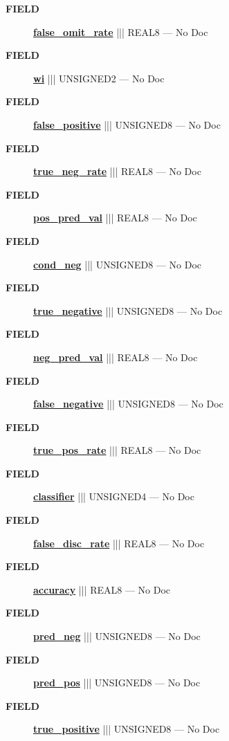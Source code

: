 \par
\begin{description}
\item [\colorbox{tagtype}{\color{white} \textbf{\textsf{FIELD}}}] \textbf{\underline{false\_omit\_rate}} ||| REAL8 --- No Doc
\item [\colorbox{tagtype}{\color{white} \textbf{\textsf{FIELD}}}] \textbf{\underline{wi}} ||| UNSIGNED2 --- No Doc
\item [\colorbox{tagtype}{\color{white} \textbf{\textsf{FIELD}}}] \textbf{\underline{false\_positive}} ||| UNSIGNED8 --- No Doc
\item [\colorbox{tagtype}{\color{white} \textbf{\textsf{FIELD}}}] \textbf{\underline{true\_neg\_rate}} ||| REAL8 --- No Doc
\item [\colorbox{tagtype}{\color{white} \textbf{\textsf{FIELD}}}] \textbf{\underline{pos\_pred\_val}} ||| REAL8 --- No Doc
\item [\colorbox{tagtype}{\color{white} \textbf{\textsf{FIELD}}}] \textbf{\underline{cond\_neg}} ||| UNSIGNED8 --- No Doc
\item [\colorbox{tagtype}{\color{white} \textbf{\textsf{FIELD}}}] \textbf{\underline{true\_negative}} ||| UNSIGNED8 --- No Doc
\item [\colorbox{tagtype}{\color{white} \textbf{\textsf{FIELD}}}] \textbf{\underline{neg\_pred\_val}} ||| REAL8 --- No Doc
\item [\colorbox{tagtype}{\color{white} \textbf{\textsf{FIELD}}}] \textbf{\underline{false\_negative}} ||| UNSIGNED8 --- No Doc
\item [\colorbox{tagtype}{\color{white} \textbf{\textsf{FIELD}}}] \textbf{\underline{true\_pos\_rate}} ||| REAL8 --- No Doc
\item [\colorbox{tagtype}{\color{white} \textbf{\textsf{FIELD}}}] \textbf{\underline{classifier}} ||| UNSIGNED4 --- No Doc
\item [\colorbox{tagtype}{\color{white} \textbf{\textsf{FIELD}}}] \textbf{\underline{false\_disc\_rate}} ||| REAL8 --- No Doc
\item [\colorbox{tagtype}{\color{white} \textbf{\textsf{FIELD}}}] \textbf{\underline{accuracy}} ||| REAL8 --- No Doc
\item [\colorbox{tagtype}{\color{white} \textbf{\textsf{FIELD}}}] \textbf{\underline{pred\_neg}} ||| UNSIGNED8 --- No Doc
\item [\colorbox{tagtype}{\color{white} \textbf{\textsf{FIELD}}}] \textbf{\underline{pred\_pos}} ||| UNSIGNED8 --- No Doc
\item [\colorbox{tagtype}{\color{white} \textbf{\textsf{FIELD}}}] \textbf{\underline{true\_positive}} ||| UNSIGNED8 --- No Doc

\end{description}
